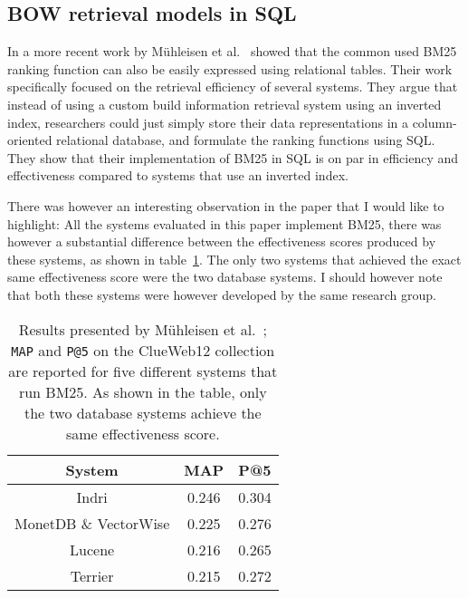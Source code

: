 


\subsection{BOW retrieval models in SQL}

In a more recent work by M\"{u}hleisen et al.~\cite{OldDog} showed that the common used BM25 ranking function can also be easily expressed using relational tables. Their work specifically focused on the retrieval efficiency of several systems. They argue that instead of using a custom build information retrieval system using an inverted index, researchers could just simply store their data representations in a column-oriented relational database, and formulate the ranking functions using SQL. They show that their implementation of BM25 in SQL is on par in efficiency and effectiveness compared to systems that use an inverted index. 

There was however an interesting observation in the paper that I would like to highlight: All the systems evaluated in this paper implement BM25, there was however a substantial difference between the effectiveness scores produced by these systems, as shown in table~\ref{olddog_results}. The only two systems that achieved the exact same effectiveness score were the two database systems. I should however note that both these systems were however developed by the same research group.

\begin{table}
	\centering
	\caption{Results presented by M\"{u}hleisen et al.~\cite{OldDog}; \texttt{MAP} and \texttt{P@5} on the ClueWeb12 collection are reported for five different systems that run BM25. As shown in the table, only the two database systems achieve the same effectiveness score.}
	\label{olddog_results}
	\begin{tabular}{c c c}
		\toprule
		System &  MAP & P@5 \\
		\midrule
		Indri & 0.246 & 0.304 \\
		MonetDB \& VectorWise & 0.225 & 0.276 \\
		Lucene & 0.216 & 0.265 \\
		Terrier & 0.215 & 0.272 \\
		\bottomrule
	\end{tabular}
\end{table}

